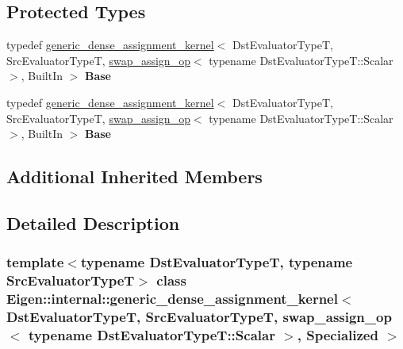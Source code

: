 \subsection*{Protected Types}
\begin{DoxyCompactItemize}
\item 
\mbox{\label{class_eigen_1_1internal_1_1generic__dense__assignment__kernel_3_01_dst_evaluator_type_t_00_01_sr759181e846694beea0b332c7e3bbe519_a82ba87f046730247fa44c41b2ff4628a}} 
typedef \hyperlink{class_eigen_1_1internal_1_1generic__dense__assignment__kernel}{generic\+\_\+dense\+\_\+assignment\+\_\+kernel}$<$ Dst\+Evaluator\+TypeT, Src\+Evaluator\+TypeT, \hyperlink{struct_eigen_1_1internal_1_1swap__assign__op}{swap\+\_\+assign\+\_\+op}$<$ typename Dst\+Evaluator\+Type\+T\+::\+Scalar $>$, Built\+In $>$ {\bfseries Base}
\item 
\mbox{\label{class_eigen_1_1internal_1_1generic__dense__assignment__kernel_3_01_dst_evaluator_type_t_00_01_sr759181e846694beea0b332c7e3bbe519_a82ba87f046730247fa44c41b2ff4628a}} 
typedef \hyperlink{class_eigen_1_1internal_1_1generic__dense__assignment__kernel}{generic\+\_\+dense\+\_\+assignment\+\_\+kernel}$<$ Dst\+Evaluator\+TypeT, Src\+Evaluator\+TypeT, \hyperlink{struct_eigen_1_1internal_1_1swap__assign__op}{swap\+\_\+assign\+\_\+op}$<$ typename Dst\+Evaluator\+Type\+T\+::\+Scalar $>$, Built\+In $>$ {\bfseries Base}
\end{DoxyCompactItemize}
\subsection*{Additional Inherited Members}


\subsection{Detailed Description}
\subsubsection*{template$<$typename Dst\+Evaluator\+TypeT, typename Src\+Evaluator\+TypeT$>$\newline
class Eigen\+::internal\+::generic\+\_\+dense\+\_\+assignment\+\_\+kernel$<$ Dst\+Evaluator\+Type\+T, Src\+Evaluator\+Type\+T, swap\+\_\+assign\+\_\+op$<$ typename Dst\+Evaluator\+Type\+T\+::\+Scalar $>$, Specialized $>$}



